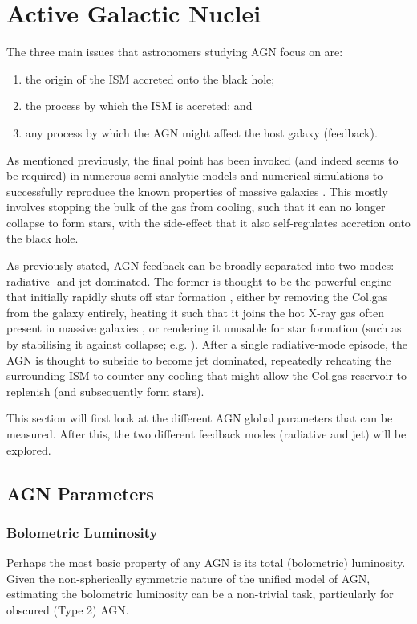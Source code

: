 \section{Active Galactic Nuclei}
	\label{sec:AGN}
	The three main issues that astronomers studying AGN focus on are:
	\begin{enumerate}
		\item the origin of the ISM accreted onto the black hole;
		\item the process by which the ISM is accreted; and
		\item any process by which the AGN might affect the host galaxy (feedback).
	\end{enumerate}
	As mentioned previously, the final point has been invoked (and indeed seems to be required) in numerous semi-analytic models and numerical simulations to successfully reproduce the known properties of massive galaxies \citep[e.g.][etc.]{DiMatteo2005, Bower2006, Springel2005}. This mostly involves stopping the bulk of the gas from cooling, such that it can no longer collapse to form stars, with the side-effect that it also self-regulates accretion onto the black hole.

	As previously stated, AGN feedback can be broadly separated into two modes: radiative- and jet-dominated. The former is thought to be the powerful engine that initially rapidly shuts off star formation \citep[e.g.][]{Thomas2005, Thomas2010}, either by removing the Col.gas from the galaxy entirely, heating it such that it joins the hot X-ray gas often present in massive galaxies \citep[e.g.][]{OSullivan2001}, or rendering it unusable for star formation (such as by stabilising it against collapse; e.g. \citealt{Martig2009}). After a single radiative-mode episode, the AGN is thought to subside to become jet dominated, repeatedly reheating the surrounding ISM to counter any cooling that might allow the Col.gas reservoir to replenish (and subsequently form stars). 

	This section will first look at the different AGN global parameters that can be measured. After this, the two different feedback modes (radiative and jet) will be explored.

	\subsection{AGN Parameters}
		\label{subsec:AGNparams}

		\subsubsection{Bolometric Luminosity}
			Perhaps the most basic property of any AGN is its total (bolometric) luminosity. Given the non-spherically symmetric nature of the unified model of AGN, estimating the bolometric luminosity can be a non-trivial task, particularly for obscured (Type 2) AGN. 

